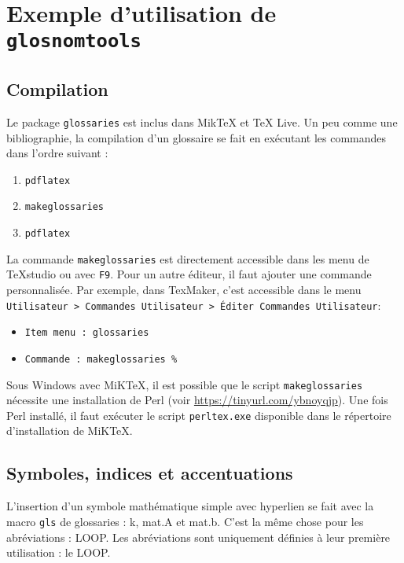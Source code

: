 \documentclass[PhD,nohyperref,english,french]{ulthese}
\begin{document}
	
\frontmatter  
           
\frontispice
\printglossary[title=Nomenclature]

\mainmatter                     

\chapter{Exemple d'utilisation de \texttt{glosnomtools}}

\section{Compilation}
Le package \texttt{glossaries} est inclus dans MikTeX et TeX Live. Un peu comme une bibliographie, la compilation d'un glossaire se fait en exécutant les commandes dans l'ordre suivant :
\begin{enumerate}
	\item \texttt{pdflatex}
	\item \texttt{makeglossaries}
	\item \texttt{pdflatex}
\end{enumerate}
La commande \texttt{makeglossaries} est directement accessible dans les menu de TeXstudio ou avec \texttt{F9}. Pour un autre éditeur, il faut ajouter une commande personnalisée. Par exemple, dans TexMaker, c’est accessible dans le menu \texttt{Utilisateur > Commandes Utilisateur > Éditer Commandes Utilisateur}:
\begin{itemize}
	\item \texttt{Item menu : glossaries} 
	\item \texttt{Commande : makeglossaries \%}
\end{itemize}
Sous Windows avec MiKTeX, il est possible que le script \texttt{makeglossaries} nécessite une installation de Perl (voir \url{https://tinyurl.com/ybnoyqjp}). Une fois Perl installé, il faut exécuter le script \texttt{perltex.exe} disponible dans le répertoire d'installation de MiKTeX.

\section{Symboles, indices et accentuations}
L'insertion d'un symbole mathématique simple avec hyperlien se fait avec la macro \texttt{gls} de glossaries : \gls{k}, \gls{mat.A} et \gls{mat.b}. C'est la même chose pour les abréviations : \gls{LOOP}. Les abréviations sont uniquement définies à leur première utilisation : le \gls{LOOP}.
\end{document}
